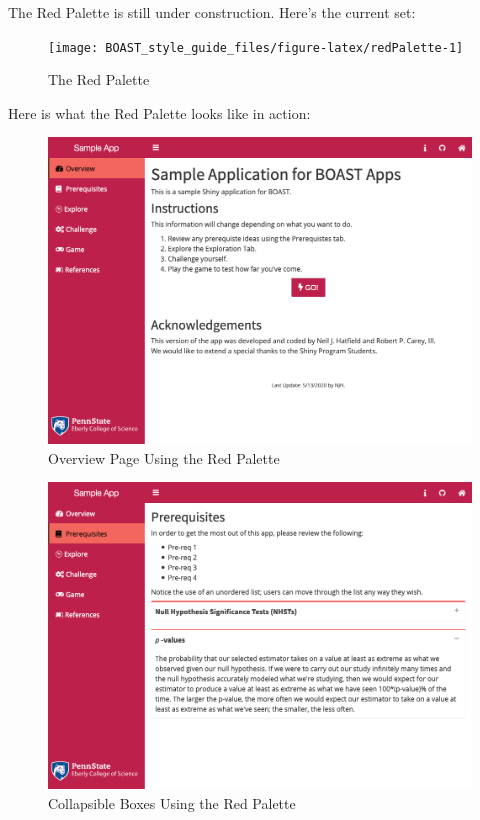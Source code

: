 \documentclass[]{book}
\begin{document}
The Red Palette is still under construction. Here's the current set:

\begin{figure}

{\centering \texttt{[image: BOAST\_style\_guide\_files/figure-latex/redPalette-1]} 

}

\caption{The Red Palette}\label{fig:redPalette}
\end{figure}

Here is what the Red Palette looks like in action:

\begin{figure}

{\centering \includegraphics[width=14in]{images/redOverview} 

}

\caption{Overview Page Using the Red Palette}\label{fig:redAction1}
\end{figure}

\begin{figure}

{\centering \includegraphics[width=14in]{images/redCollapse} 

}

\caption{Collapsible Boxes Using the Red Palette}\label{fig:redAction2}
\end{figure}
\end{document}
